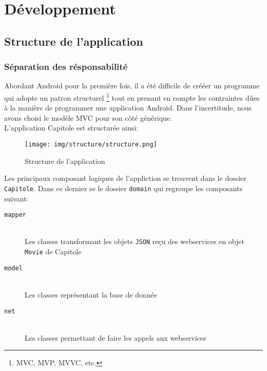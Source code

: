 \chapter{Développement}

\section{Structure de l'application}
\subsection*{Séparation des résponsabilité}
Abordant Android pour la première fois, il a été difficile de crééer un programme qui adopte un patron structurel \footnote{MVC, MVP, MVVC, etc.} tout en prenant en compte les contraintes dûes à la manière de programmer une application Android. Dans l'incertitude, nous avons choisi le modèle MVC pour son côté générique. \\

L'application Capitole est structurée ainsi:
    \begin{figure}[H]
        \centering
            \texttt{[image: img/structure/structure.png]}
            \caption{Structure de l'application}
            \label{structure}
    \end{figure}

\clearpage

Les principaux composant logiques de l'appliction se trouvent dans le dossier \texttt{Capitole}. Dans ce dernier se le dossier \texttt{domain} qui regroupe les composants suivant:\\

\begin{description}
	\item [\texttt{mapper}]  \hfill \\
	Les classes transformant les objets \texttt{JSON} reçu des webservices en objet \texttt{Movie} de Capitole
	\item [\texttt{model}]  \hfill \\
	Les classes représentant la base de donnée
	\item [\texttt{net}]  \hfill \\
	Les classes permettant de faire les appels aux webservices\\
\end{description}

